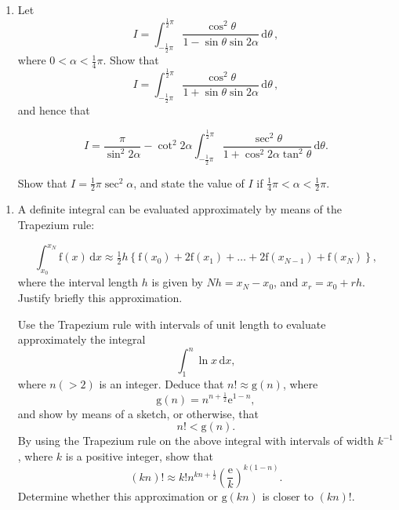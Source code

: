 \documentclass[a4, 11pt]{report}
\newlength{\qspace}
\newcounter{qnumber}
\newenvironment{question}%
 {\vspace{\qspace}
  \begin{enumerate}[\bfseries 1\quad][10]%
    \setcounter{enumi}{\value{qnumber}}%
    \item%
 }
{
  \end{enumerate}
  \filbreak
  \stepcounter{qnumber}
 }
\begin{document}
	\begin{question}
	Let
	\[
	I=\int_{-\frac{1}{2}\pi}^{\frac{1}{2}\pi}\frac{\cos^{2}\theta}{1-\sin\theta\sin2\alpha}\,\mathrm{d}\theta\, ,
	\]
	where $0<\alpha<\frac{1}{4}\pi$. Show that
	\[
	I=\int_{-\frac{1}{2}\pi}^{\frac{1}{2}\pi}\frac{\cos^{2}\theta}{1+\sin\theta\sin2\alpha}\,\mathrm{d}\theta\, ,
	\]
	and hence that


	\[
	I=\frac{\pi}{\sin^{2}2\alpha}-\cot^{2}2\alpha\int_{-\frac{1}{2}\pi}^{\frac{1}{2}\pi}\frac{\sec^{2}\theta}{1+\cos^{2}2\alpha\tan^{2}\theta}\,\mathrm{d}\theta.
	\]



	Show that $I=\frac{1}{2}\pi\sec^{2}\alpha$, and state the value of
	$I$ if $\frac{1}{4}\pi<\alpha<\frac{1}{2}\pi$.
	
	 \end{question}
	 
\begin{question}
A definite integral can be evaluated approximately by means of the Trapezium rule:


	\[
	\int_{x_{0}}^{x_{N}}\mathrm{f}(x)\,\mathrm{d}x\approx\tfrac{1}{2}h\left\{ \mathrm{f}\left(x_{0}\right)+2\mathrm{f}\left(x_{1}\right)+\ldots+2\mathrm{f}\left(x_{N-1}\right)+\mathrm{f}\left(x_{N}\right)\right\} ,
	\]
	where the interval length $h$ is given by $Nh=x_{N}-x_{0}$, and
	$x_{r}=x_{0}+rh$. Justify briefly this approximation. 


	Use the Trapezium rule with intervals of unit length to evaluate approximately
	the integral 
	\[
	\int_{1}^{n}\ln x\,\mathrm{d}x,
	\]
	where $n(>2)$ is an integer. Deduce that $n!\approx\mathrm{g}(n)$,
	where 
	\[
	\mathrm{g}(n)=n^{n+\frac{1}{2}}\mathrm{e}^{1-n},
	\]
	and show by means of a sketch, or otherwise, that 
	\[
	n!<\mathrm{g}(n).
	\]
	By using the Trapezium rule on the above integral with intervals of
	width $k^{-1}$, where $k$ is a positive integer, show that 
	\[
	\left(kn\right)!\approx k!n^{kn+\frac{1}{2}}\left(\frac{\mathrm{e}}{k}\right)^{k\left(1-n\right)}.
	\]
	Determine whether this approximation or $\mathrm{g}(kn)$ is closer
	to $\left(kn\right)!$.
	
	
	\end{question}
	
\end{document}
